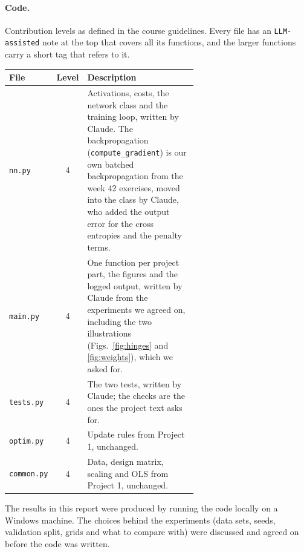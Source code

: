 \paragraph*{Code.} Contribution levels as defined in the course guidelines. Every file has an \texttt{LLM-assisted} note at the top that covers all its functions, and the larger functions carry a short tag that refers to it.

\begin{center}
    \begin{tabular}{lcp{0.62\linewidth}}
        \toprule
        File & Level & Description \\
        \midrule
        \texttt{nn.py} & 4 & Activations, costs, the network class and the training loop, written by Claude. The backpropagation (\texttt{compute\_gradient}) is our own batched backpropagation from the week 42 exercises, moved into the class by Claude, who added the output error for the cross entropies and the penalty terms. \\
        \texttt{main.py} & 4 & One function per project part, the figures and the logged output, written by Claude from the experiments we agreed on, including the two illustrations (Figs.~\ref{fig:hinges} and \ref{fig:weights}), which we asked for. \\
        \texttt{tests.py} & 4 & The two tests, written by Claude; the checks are the ones the project text asks for. \\
        \texttt{optim.py} & 4 & Update rules from Project 1, unchanged. \\
        \texttt{common.py} & 4 & Data, design matrix, scaling and OLS from Project 1, unchanged. \\
        \bottomrule
    \end{tabular}
\end{center}

The results in this report were produced by running the code locally on a Windows machine. The choices behind the experiments (data sets, seeds, validation split, grids and what to compare with) were discussed and agreed on before the code was written.
